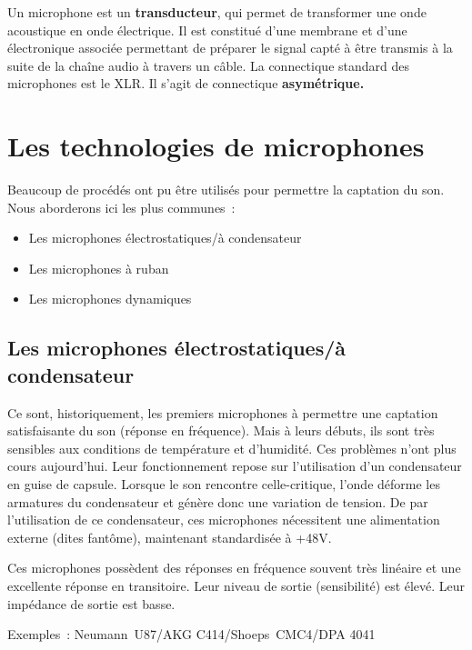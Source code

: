 \documentclass[
]{book}
\providecommand{\tightlist}{%
  \setlength{\itemsep}{0pt}\setlength{\parskip}{0pt}}
\begin{document}
Un microphone est un \textbf{transducteur}, qui permet de transformer une onde acoustique en onde électrique. Il est constitué d'une membrane et d'une électronique associée permettant de préparer le signal capté à être transmis à la suite de la chaîne audio à travers un câble. La connectique standard des microphones est le XLR. Il s'agit de connectique \textbf{asymétrique.}

\hypertarget{les-technologies-de-microphones}{%
\section{Les technologies de microphones}\label{les-technologies-de-microphones}}

Beaucoup de procédés ont pu être utilisés pour permettre la captation du son. Nous aborderons ici les plus communes~:

\begin{itemize}
\tightlist
\item
  Les microphones électrostatiques/à condensateur
\item
  Les microphones à ruban
\item
  Les microphones dynamiques
\end{itemize}

\hypertarget{les-microphones-uxe9lectrostatiquesuxe0-condensateur}{%
\subsection{Les microphones électrostatiques/à condensateur}\label{les-microphones-uxe9lectrostatiquesuxe0-condensateur}}

Ce sont, historiquement, les premiers microphones à permettre une captation satisfaisante du son (réponse en fréquence). Mais à leurs débuts, ils sont très sensibles aux conditions de température et d'humidité. Ces problèmes n'ont plus cours aujourd'hui. Leur fonctionnement repose sur l'utilisation d'un condensateur en guise de capsule. Lorsque le son rencontre celle-critique, l'onde déforme les armatures du condensateur et génère donc une variation de tension. De par l'utilisation de ce condensateur, ces microphones nécessitent une alimentation externe (dites fantôme), maintenant standardisée à +48V.

Ces microphones possèdent des réponses en fréquence souvent très linéaire et une excellente réponse en transitoire. Leur niveau de sortie (sensibilité) est élevé. Leur impédance de sortie est basse.

Exemples~: Neumann~U87/AKG C414/Shoeps~CMC4/DPA 4041
\end{document}
